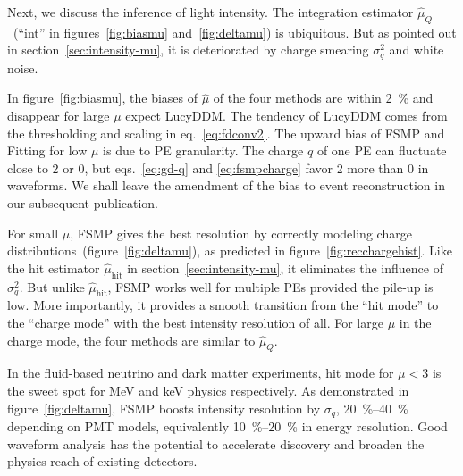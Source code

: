 Next, we discuss the inference of light intensity.  The integration estimator $\hat{\mu}_Q$~(``int'' in figures~\ref{fig:biasmu} and~\ref{fig:deltamu}) is ubiquitous.  But as pointed out in section~\ref{sec:intensity-mu}, it is deteriorated by charge smearing $\sigma_q^2$ and white noise.

In figure~\ref{fig:biasmu}, the biases of $\hat{\mu}$ of the four methods are within \SI{2}{\percent} and disappear for large $\mu$ expect LucyDDM.  The tendency of LucyDDM comes from the thresholding and scaling in eq.~\eqref{eq:fdconv2}.  The upward bias of FSMP and Fitting for low $\mu$ is due to PE granularity.  The charge $q$ of one PE can fluctuate close to 2 or 0, but eqs.~\eqref{eq:gd-q} and \eqref{eq:fsmpcharge} favor 2 more than 0 in waveforms.  We shall leave the amendment of the bias to event reconstruction in our subsequent publication.

For small $\mu$, FSMP gives the best resolution by correctly modeling charge distributions~(figure~\ref{fig:deltamu}), as predicted in figure~\ref{fig:recchargehist}.  Like the hit estimator $\hat{\mu}_\mathrm{hit}$ in section~\ref{sec:intensity-mu}, it eliminates the influence of $\sigma_q^2$. But unlike $\hat{\mu}_\mathrm{hit}$, FSMP works well for multiple PEs provided the pile-up is low.  More importantly, it provides a smooth transition from the ``hit mode'' to the ``charge mode'' with the best intensity resolution of all.  For large $\mu$ in the charge mode, the four methods are similar to $\hat{\mu}_Q$.

In the fluid-based neutrino and dark matter experiments, hit mode for $\mu < 3$ is the sweet spot for \si{MeV} and \si{keV} physics respectively.  As demonstrated in figure~\ref{fig:deltamu}, FSMP boosts intensity resolution by $\sigma_q$, \SIrange{20}{40}{\percent} depending on PMT models, equivalently \SIrange{10}{20}{\percent} in energy resolution.  Good waveform analysis has the potential to accelerate discovery and broaden the physics reach of existing detectors. 